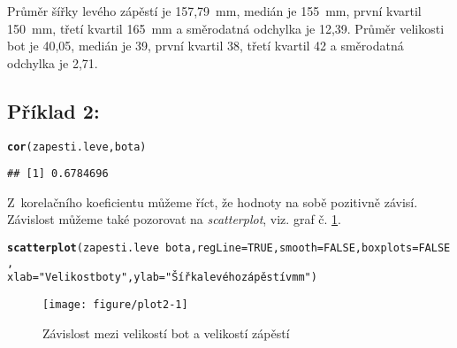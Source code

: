 \documentclass[twoside]{article}\usepackage[]{graphicx}\usepackage[]{color}
\makeatletter
\def\maxwidth{ %
  \ifdim\Gin@nat@width>\linewidth
    \linewidth
  \else
    \Gin@nat@width
  \fi
}
\newcommand{\hlnum}[1]{\textcolor[rgb]{0.686,0.059,0.569}{#1}}%
\newcommand{\hlstr}[1]{\textcolor[rgb]{0.192,0.494,0.8}{#1}}%
\newcommand{\hlopt}[1]{\textcolor[rgb]{0,0,0}{#1}}%
\newcommand{\hlstd}[1]{\textcolor[rgb]{0.345,0.345,0.345}{#1}}%
\newcommand{\hlkwc}[1]{\textcolor[rgb]{0.333,0.667,0.333}{#1}}%
\newcommand{\hlkwd}[1]{\textcolor[rgb]{0.737,0.353,0.396}{\textbf{#1}}}%
\newenvironment{kframe}{%
 \def\at@end@of@kframe{}%
 \ifinner\ifhmode%
  \def\at@end@of@kframe{\end{minipage}}%
  \begin{minipage}{\columnwidth}%
 \fi\fi%
 \def\FrameCommand##1{\hskip\@totalleftmargin \hskip-\fboxsep
 \colorbox{shadecolor}{##1}\hskip-\fboxsep
     \hskip-\linewidth \hskip-\@totalleftmargin \hskip\columnwidth}%
 \MakeFramed {\advance\hsize-\width
   \@totalleftmargin\z@ \linewidth\hsize
   \@setminipage}}%
 {\par\unskip\endMakeFramed%
 \at@end@of@kframe}
\newenvironment{knitrout}{}{} %
\makeatother
\begin{document}
Průměr šířky levého zápěstí je 157,79~\si{\milli\metre}, medián je 155~\si{\milli\metre}, první kvartil 150~\si{\milli\metre}, třetí kvartil 165~\si{\milli\metre} a směrodatná odchylka je 12,39. Průměr velikosti bot je 40,05, medián je 39, první kvartil 38, třetí kvartil 42 a směrodatná odchylka je 2,71.

\subsection*{Příklad 2:}
\begin{knitrout}
\color{fgcolor}\begin{kframe}
\begin{alltt}
\hlkwd{cor}\hlstd{(zapesti.leve, bota)}
\end{alltt}
\begin{verbatim}
## [1] 0.6784696
\end{verbatim}
\end{kframe}
\end{knitrout}

Z~korelačního koeficientu můžeme říct, že hodnoty na sobě pozitivně závisí. Závislost můžeme také pozorovat na \emph{scatterplot}, viz. graf č. \ref{fig:plot2}.
\begin{knitrout}
\color{fgcolor}\begin{kframe}
\begin{alltt}
\hlkwd{scatterplot}\hlstd{(zapesti.leve}\hlopt{~}\hlstd{bota,} \hlkwc{regLine}\hlstd{=}\hlnum{TRUE}\hlstd{,} \hlkwc{smooth}\hlstd{=}\hlnum{FALSE}\hlstd{,} \hlkwc{boxplots}\hlstd{=}\hlnum{FALSE}\hlstd{,}
    \hlkwc{xlab}\hlstd{=}\hlstr{"Velikost boty"}\hlstd{,} \hlkwc{ylab}\hlstd{=}\hlstr{"Šířka levého zápěstí v mm"}\hlstd{)}
\end{alltt}
\end{kframe}\begin{figure}[h]
\texttt{[image: figure/plot2-1]} \caption[Závislost mezi velikostí bot a velikostí zápěstí]{Závislost mezi velikostí bot a velikostí zápěstí}\label{fig:plot2}
\end{figure}


\end{knitrout}


\newpage
\end{document}
